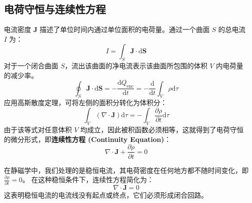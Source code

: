 \documentclass[fontset=none]{ctexart}
\begin{document}
\subsection{电荷守恒与连续性方程}
电流密度 $\bm{J}$ 描述了单位时间内通过单位面积的电荷量。通过一个曲面 $S$ 的总电流 $I$ 为：
\begin{equation}
    I = \int_S \bm{J} \cdot \mathrm{d}\bm{S}
\end{equation}
对于一个闭合曲面 $S$，流出该曲面的净电流表示该曲面所包围的体积 $V$ 内电荷量的减少率。
\begin{equation}
    \oint_S \bm{J} \cdot \mathrm{d}\bm{S} = -\frac{\mathrm{d}Q_{\text{enc}}}{\mathrm{d}t} = -\frac{\mathrm{d}}{\mathrm{d}t} \int_V \rho \mathrm{d}\tau
\end{equation}
应用高斯散度定理，可将左侧的面积分转化为体积分：
\begin{equation}
    \int_V (\nabla \cdot \bm{J}) \mathrm{d}\tau = -\int_V \frac{\partial\rho}{\partial t} \mathrm{d}\tau
\end{equation}
由于该等式对任意体积 $V$ 均成立，因此被积函数必须相等，这就得到了电荷守恒的微分形式，即\textbf{连续性方程 (Continuity Equation)}：
\begin{equation}
    \nabla \cdot \bm{J} + \frac{\partial\rho}{\partial t} = 0
\end{equation}
\begin{definition}[稳恒电流]
    在静磁学中，我们处理的是稳恒电流，其电荷密度在任何地方都不随时间变化，即 $\frac{\partial\rho}{\partial t} = 0$。
    在这种稳恒条件下，连续性方程简化为：
    \begin{equation}
        \nabla \cdot \bm{J} = 0
    \end{equation}
    这表明稳恒电流的电流线没有起点或终点，它们必须形成闭合回路。
\end{definition}
\end{document}
